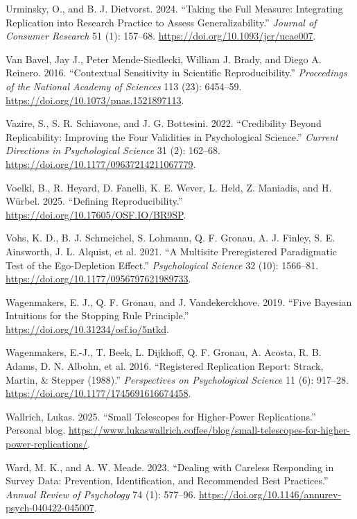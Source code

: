 \documentclass[
  letterpaper,
  DIV=11,
  openany,
  fontsize=12pt,
  parskip=half,
  headings=big,
  numbers=noenddot,
  titlepage=false]{scrreprt}
\newlength{\cslhangindent}
\newenvironment{CSLReferences}[2] %
 {\begin{list}{}{%
  \setlength{\itemindent}{0pt}
  \setlength{\leftmargin}{0pt}
  \setlength{\parsep}{0pt}
  \ifodd #1
   \setlength{\leftmargin}{\cslhangindent}
   \setlength{\itemindent}{-1\cslhangindent}
  \fi
  \setlength{\itemsep}{#2\baselineskip}}}
 {\end{list}}
\begin{document}
\begin{CSLReferences}{1}{0}
Urminsky, O., and B. J. Dietvorst. 2024. {``Taking the Full Measure:
Integrating Replication into Research Practice to Assess
Generalizability.''} \emph{Journal of Consumer Research} 51 (1):
157--68. \url{https://doi.org/10.1093/jcr/ucae007}.

Van Bavel, Jay J., Peter Mende-Siedlecki, William J. Brady, and Diego A.
Reinero. 2016. {``Contextual Sensitivity in Scientific
Reproducibility.''} \emph{Proceedings of the National Academy of
Sciences} 113 (23): 6454--59.
\url{https://doi.org/10.1073/pnas.1521897113}.

Vazire, S., S. R. Schiavone, and J. G. Bottesini. 2022. {``Credibility
Beyond Replicability: Improving the Four Validities in Psychological
Science.''} \emph{Current Directions in Psychological Science} 31 (2):
162--68. \url{https://doi.org/10.1177/09637214211067779}.

Voelkl, B., R. Heyard, D. Fanelli, K. E. Wever, L. Held, Z. Maniadis,
and H. Würbel. 2025. {``Defining Reproducibility.''}
\url{https://doi.org/10.17605/OSF.IO/BR9SP}.

Vohs, K. D., B. J. Schmeichel, S. Lohmann, Q. F. Gronau, A. J. Finley,
S. E. Ainsworth, J. L. Alquist, et al. 2021. {``A Multisite
Preregistered Paradigmatic Test of the Ego-Depletion Effect.''}
\emph{Psychological Science} 32 (10): 1566--81.
\url{https://doi.org/10.1177/0956797621989733}.

Wagenmakers, E. J., Q. F. Gronau, and J. Vandekerckhove. 2019. {``Five
Bayesian Intuitions for the Stopping Rule Principle.''}
\url{https://doi.org/10.31234/osf.io/5ntkd}.

Wagenmakers, E.-J., T. Beek, L. Dijkhoff, Q. F. Gronau, A. Acosta, R. B.
Adams, D. N. Albohn, et al. 2016. {``Registered Replication Report:
Strack, Martin, \& Stepper (1988).''} \emph{Perspectives on
Psychological Science} 11 (6): 917--28.
\url{https://doi.org/10.1177/1745691616674458}.

Wallrich, Lukas. 2025. {``Small Telescopes for Higher-Power
Replications.''} Personal blog.
\url{https://www.lukaswallrich.coffee/blog/small-telescopes-for-higher-power-replications/}.

Ward, M. K., and A. W. Meade. 2023. {``Dealing with Careless Responding
in Survey Data: Prevention, Identification, and Recommended Best
Practices.''} \emph{Annual Review of Psychology} 74 (1): 577--96.
\url{https://doi.org/10.1146/annurev-psych-040422-045007}.


\end{CSLReferences}
\end{document}
